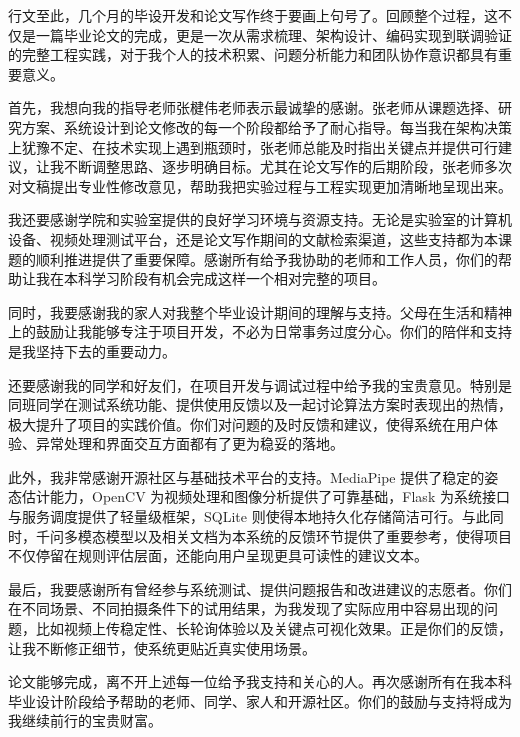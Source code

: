 \documentclass[UTF8,twoside]{ctexrep}
\makeatletter
\def@NAT@last@yr{\@citea}%
\def@NAT@last@yr{-\NAT@penalty}%
\makeatother
\begin{document}
{\songti{}
\setlength{\parindent}{2em}
\indent 行文至此，几个月的毕设开发和论文写作终于要画上句号了。回顾整个过程，这不仅是一篇毕业论文的完成，更是一次从需求梳理、架构设计、编码实现到联调验证的完整工程实践，对于我个人的技术积累、问题分析能力和团队协作意识都具有重要意义。

\indent 首先，我想向我的指导老师张楗伟老师表示最诚挚的感谢。张老师从课题选择、研究方案、系统设计到论文修改的每一个阶段都给予了耐心指导。每当我在架构决策上犹豫不定、在技术实现上遇到瓶颈时，张老师总能及时指出关键点并提供可行建议，让我不断调整思路、逐步明确目标。尤其在论文写作的后期阶段，张老师多次对文稿提出专业性修改意见，帮助我把实验过程与工程实现更加清晰地呈现出来。

\indent 我还要感谢学院和实验室提供的良好学习环境与资源支持。无论是实验室的计算机设备、视频处理测试平台，还是论文写作期间的文献检索渠道，这些支持都为本课题的顺利推进提供了重要保障。感谢所有给予我协助的老师和工作人员，你们的帮助让我在本科学习阶段有机会完成这样一个相对完整的项目。

\indent 同时，我要感谢我的家人对我整个毕业设计期间的理解与支持。父母在生活和精神上的鼓励让我能够专注于项目开发，不必为日常事务过度分心。你们的陪伴和支持是我坚持下去的重要动力。

\indent 还要感谢我的同学和好友们，在项目开发与调试过程中给予我的宝贵意见。特别是同班同学在测试系统功能、提供使用反馈以及一起讨论算法方案时表现出的热情，极大提升了项目的实践价值。你们对问题的及时反馈和建议，使得系统在用户体验、异常处理和界面交互方面都有了更为稳妥的落地。

\indent 此外，我非常感谢开源社区与基础技术平台的支持。MediaPipe 提供了稳定的姿态估计能力，OpenCV 为视频处理和图像分析提供了可靠基础，Flask 为系统接口与服务调度提供了轻量级框架，SQLite 则使得本地持久化存储简洁可行。与此同时，千问多模态模型以及相关文档为本系统的反馈环节提供了重要参考，使得项目不仅停留在规则评估层面，还能向用户呈现更具可读性的建议文本。

\indent 最后，我要感谢所有曾经参与系统测试、提供问题报告和改进建议的志愿者。你们在不同场景、不同拍摄条件下的试用结果，为我发现了实际应用中容易出现的问题，比如视频上传稳定性、长轮询体验以及关键点可视化效果。正是你们的反馈，让我不断修正细节，使系统更贴近真实使用场景。

\indent 论文能够完成，离不开上述每一位给予我支持和关心的人。再次感谢所有在我本科毕业设计阶段给予帮助的老师、同学、家人和开源社区。你们的鼓励与支持将成为我继续前行的宝贵财富。
}

\end{document}
